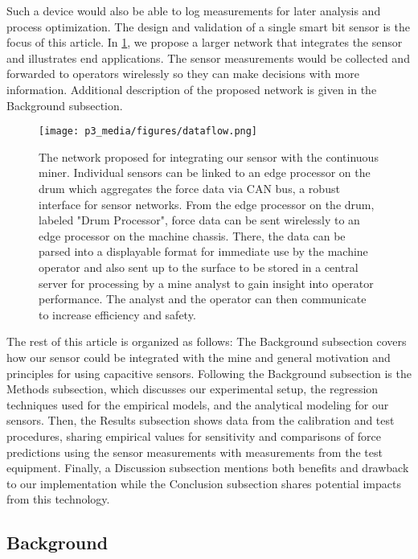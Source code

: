 Such a device would also be able to log measurements for later analysis and process optimization.
The design and validation of a single smart bit sensor is the focus of this article.
In \ref{fig:network_proposal}, we propose a larger network that integrates the sensor
and illustrates end applications.
The sensor measurements would be collected and forwarded to operators wirelessly 
so they can make decisions with more information.
Additional description of the proposed network is given in the Background subsection.

\begin{figure}[t]
\centering
\texttt{[image: p3\_media/figures/dataflow.png]}
\caption{The network proposed for integrating our sensor with the continuous miner.
Individual sensors can be linked to an edge processor on the drum which aggregates the force data via CAN bus,
a robust interface for sensor networks. From the edge processor on the drum, labeled "Drum Processor",
force data can be sent wirelessly to an edge processor on the machine chassis. 
There, the data can be parsed into a displayable format for
immediate use by the machine operator and also sent up to the surface to be stored in a central server for 
processing by a mine analyst to gain insight into operator performance. 
The analyst and the operator can then communicate to increase efficiency and safety.}
\label{fig:network_proposal}
\end{figure}


The rest of this article is organized as follows:
The Background subsection covers how our sensor could be integrated with the mine and
general motivation and principles for using capacitive sensors.
Following the Background subsection is the Methods subsection, 
which discusses our experimental setup, 
the regression techniques used for the empirical models,
and the analytical modeling for our sensors. 
Then, the Results subsection shows data from the calibration and test procedures, 
sharing empirical values for sensitivity 
and comparisons of force predictions using the sensor measurements 
with measurements from the test equipment.
Finally, a Discussion subsection mentions both benefits and drawback to our implementation
while the Conclusion subsection shares potential impacts from this technology.

 
\subsection{Background}

